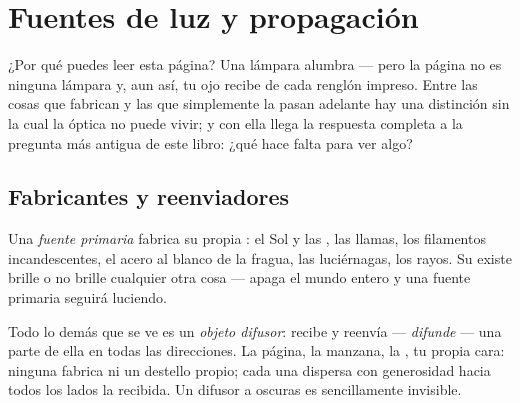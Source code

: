 \chapter{Fuentes de luz y propagación}\label{ch:g7:light-sources-propagation}

¿Por qué puedes leer esta página? Una lámpara alumbra --- pero la
página no es ninguna lámpara y, aun así, tu ojo recibe  de cada
renglón impreso. Entre las cosas que fabrican  y las que
simplemente la pasan adelante hay una distinción sin la cual la óptica
no puede vivir; y con ella llega la respuesta completa a la pregunta
más antigua de este libro: ¿qué hace falta para ver algo?

\section{Fabricantes y reenviadores}

\begin{definition}\label{def:g7:light-sources-propagation:primary}
Una \emph{fuente primaria} fabrica su propia
: el Sol y las , las llamas, los filamentos
incandescentes, el acero al blanco de la fragua, las luciérnagas, los
rayos. Su  existe brille o no brille cualquier otra cosa ---
apaga el mundo entero y una fuente primaria seguirá luciendo.
\end{definition}

\begin{definition}\label{def:g7:light-sources-propagation:diffusion}
Todo lo demás que se ve es un \emph{objeto
difusor}: recibe  y reenvía --- \emph{difunde}
--- una parte de ella en todas las direcciones. La página, la manzana,
la , tu propia cara: ninguna fabrica ni un destello propio;
cada una dispersa con generosidad hacia todos los lados la 
recibida. Un difusor a oscuras es sencillamente invisible.
\end{definition}

